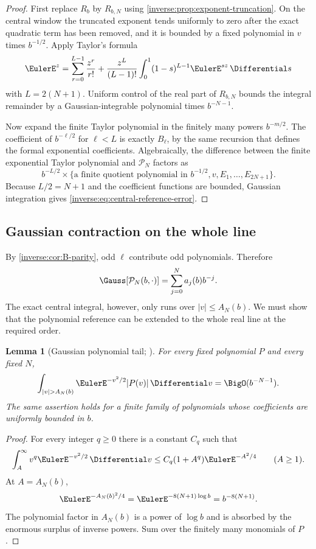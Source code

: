 \documentclass[11pt,oneside]{article}
\newtheorem{lemma}[lemma]{Lemma}
\theoremstyle{definition}
\theoremstyle{remark}
\begin{document}
\begin{proof}
First replace $R_b$ by $R_{b,N}$ using
\cref{inverse:prop:exponent-truncation}.  On the central window the truncated
exponent tends uniformly to zero after the exact quadratic term has been
removed, and it is bounded by a fixed polynomial in $v$ times
$b^{-1/2}$.  Apply Taylor's formula
\[
 \EulerE^z=\sum_{r=0}^{L-1}\frac{z^r}{r!}
      +\frac{z^L}{(L-1)!}\int_0^1(1-s)^{L-1}\EulerE^{sz}\,\Differential s
\]
with $L=2(N+1)$.  Uniform control of the real part of $R_{b,N}$ bounds the
integral remainder by a Gaussian-integrable polynomial times
$b^{-N-1}$.

Now expand the finite Taylor polynomial in the finitely many powers
$b^{-m/2}$.  The coefficient of $b^{-\ell/2}$ for
$\ell<L$ is exactly $B_\ell$, by the same recursion that defines the
formal exponential coefficients.  Algebraically, the difference between
the finite exponential Taylor polynomial and
$\mathcal P_N$ factors as
\[
 b^{-L/2}\times
 \{\text{a finite quotient polynomial in }b^{-1/2},v,
   E_1,\dots,E_{2N+1}\}.
\]
Because $L/2=N+1$ and the coefficient functions are bounded, Gaussian
integration gives \eqref{inverse:eq:central-reference-error}.
\end{proof}

\subsection{Gaussian contraction on the whole line}

By \cref{inverse:cor:B-parity}, odd $\ell$ contribute odd polynomials.  Therefore
\begin{equation}
 \Gauss[\mathcal P_N(b,\cdot)]
 =\sum_{j=0}^{N}a_j(b)b^{-j}. \label{inverse:eq:reference-contraction}
\end{equation}
The exact central integral, however, only runs over
$|v|\leq A_N(b)$.  We must show that the polynomial reference can be
extended to the whole real line at the required order.

\begin{lemma}[Gaussian polynomial tail; \Formalized]
\label{inverse:lem:gaussian-polynomial-tail}
For every fixed polynomial $P$ and every fixed $N$,
\[
 \int_{|v|>A_N(b)}\EulerE^{-v^2/2}|P(v)|\,\Differential v
 =\BigO(b^{-N-1}).
\]
The same assertion holds for a finite family of polynomials whose
coefficients are uniformly bounded in $b$.
\end{lemma}

\begin{proof}
For every integer $q\geq0$ there is a constant $C_q$ such that
\[
 \int_A^\infty v^q\EulerE^{-v^2/2}\,\Differential v
 \leq C_q(1+A^q)\EulerE^{-A^2/4}
 \qquad(A\geq1).
\]
At $A=A_N(b)$,
\[
 \EulerE^{-A_N(b)^2/4}
 =\EulerE^{-8(N+1)\log b}
 =b^{-8(N+1)}.
\]
The polynomial factor in $A_N(b)$ is a power of $\log b$ and is absorbed
by the enormous surplus of inverse powers.  Sum over the finitely many
monomials of $P$.
\end{proof}
\end{document}
